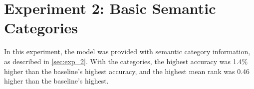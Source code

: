 \section{Experiment 2: Basic Semantic Categories}
In this experiment, the model was provided with semantic category information, as described in \ref{sec:exp_2}.
With the categories, the highest accuracy was 1.4\% higher than the baseline's highest accuracy, and the highest mean rank was 0.46 higher than the baseline's highest. \newline


